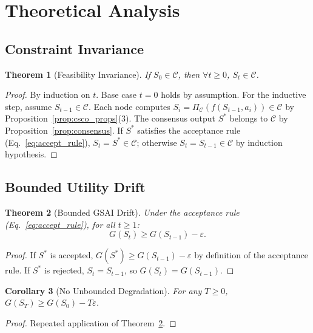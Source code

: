 \documentclass[11pt,letterpaper]{article}
\newtheorem{theorem}{Theorem}[section]
\newtheorem{corollary}[theorem]{Corollary}
\newcommand{\cC}{\mathcal{C}}
\begin{document}
\section{Theoretical Analysis}

\subsection{Constraint Invariance}

\begin{theorem}[Feasibility Invariance]
\label{thm:feasibility}
If $S_0 \in \cC$, then $\forall t \geq 0$, $S_t \in \cC$.
\end{theorem}
\begin{proof}
By induction on $t$. Base case $t=0$ holds by assumption. For the
inductive step, assume $S_{t-1} \in \cC$. Each node computes
$S_i = \Pi_{\cC}(f(S_{t-1}, a_i)) \in \cC$ by
Proposition~\ref{prop:csco_props}(3). The consensus output
$S^*$ belongs to $\cC$ by Proposition~\ref{prop:consensus}.
If $S^*$ satisfies the acceptance rule
(Eq.~\eqref{eq:accept_rule}), $S_t = S^* \in \cC$; otherwise
$S_t = S_{t-1} \in \cC$ by induction hypothesis.
\end{proof}

\subsection{Bounded Utility Drift}

\begin{theorem}[Bounded GSAI Drift]
\label{thm:drift}
Under the acceptance rule (Eq.~\eqref{eq:accept_rule}),
for all $t \geq 1$:
\begin{equation}
    G(S_{t}) \geq G(S_{t-1}) - \varepsilon.
    \label{eq:drift_bound}
\end{equation}
\end{theorem}
\begin{proof}
If $S^*$ is accepted, $G(S^*) \geq G(S_{t-1}) - \varepsilon$ by
definition of the acceptance rule. If $S^*$ is rejected,
$S_t = S_{t-1}$, so $G(S_t) = G(S_{t-1})$.
\end{proof}

\begin{corollary}[No Unbounded Degradation]
\label{cor:no_degradation}
For any $T \geq 0$, $G(S_T) \geq G(S_0) - T\varepsilon$.
\end{corollary}
\begin{proof}
Repeated application of Theorem~\ref{thm:drift}.
\end{proof}
\end{document}
